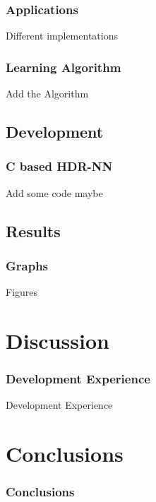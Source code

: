 \documentclass{beamer}
\begin{document}
\begin{frame}
  \frametitle{Applications}

  Different implementations

\end{frame}

\begin{frame}
  \frametitle{Learning Algorithm}

  Add the Algorithm

\end{frame}

\subsection{Development}

\begin{frame}
  \frametitle{C based HDR-NN}

  Add some code maybe

\end{frame}


\subsection{Results}

\begin{frame}
  \frametitle{Graphs}

  Figures

\end{frame}

\section{Discussion}

\begin{frame}[fragile]
  \frametitle{Development Experience}

  Development Experience

\end{frame}

\section{Conclusions}

\begin{frame}
  \frametitle{Conclusions}

\end{frame}
\end{document}
